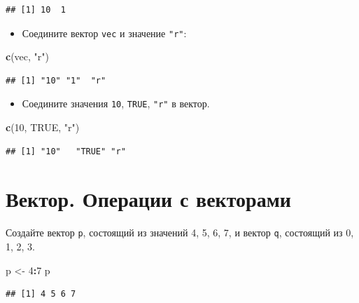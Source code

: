 \documentclass[]{book}
\newenvironment{Shaded}{\begin{snugshade}}{\end{snugshade}}
\newcommand{\KeywordTok}[1]{\textcolor[rgb]{0.13,0.29,0.53}{\textbf{#1}}}
\newcommand{\DecValTok}[1]{\textcolor[rgb]{0.00,0.00,0.81}{#1}}
\newcommand{\StringTok}[1]{\textcolor[rgb]{0.31,0.60,0.02}{#1}}
\newcommand{\OtherTok}[1]{\textcolor[rgb]{0.56,0.35,0.01}{#1}}
\newcommand{\OperatorTok}[1]{\textcolor[rgb]{0.81,0.36,0.00}{\textbf{#1}}}
\newcommand{\NormalTok}[1]{#1}
\providecommand{\tightlist}{%
  \setlength{\itemsep}{0pt}\setlength{\parskip}{0pt}}
\begin{document}
\begin{verbatim}
## [1] 10  1
\end{verbatim}

\begin{itemize}
\tightlist
\item
  Соедините вектор \texttt{vec} и значение \texttt{"r"}:
\end{itemize}

\begin{Shaded}
\begin{Highlighting}[]
\KeywordTok{c}\NormalTok{(vec, }\StringTok{"r"}\NormalTok{)}
\end{Highlighting}
\end{Shaded}

\begin{verbatim}
## [1] "10" "1"  "r"
\end{verbatim}

\begin{itemize}
\tightlist
\item
  Соедините значения \texttt{10}, \texttt{TRUE}, \texttt{"r"} в вектор.
\end{itemize}

\begin{Shaded}
\begin{Highlighting}[]
\KeywordTok{c}\NormalTok{(}\DecValTok{10}\NormalTok{, }\OtherTok{TRUE}\NormalTok{, }\StringTok{"r"}\NormalTok{)}
\end{Highlighting}
\end{Shaded}

\begin{verbatim}
## [1] "10"   "TRUE" "r"
\end{verbatim}

\section{Вектор. Операции с векторами}\label{solvvec_op}

Создайте вектор \texttt{p}, состоящий из значений 4, 5, 6, 7, и вектор
\texttt{q}, состоящий из 0, 1, 2, 3.

\begin{Shaded}
\begin{Highlighting}[]
\NormalTok{p <-}\StringTok{ }\DecValTok{4}\OperatorTok{:}\DecValTok{7}
\NormalTok{p}
\end{Highlighting}
\end{Shaded}

\begin{verbatim}
## [1] 4 5 6 7
\end{verbatim}
\end{document}

